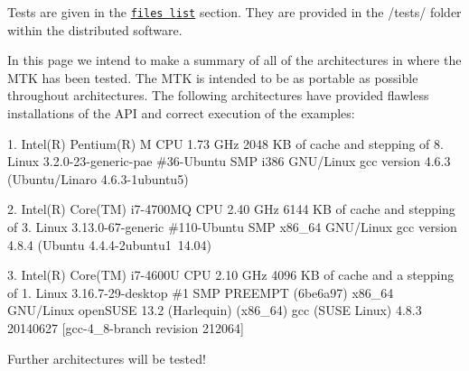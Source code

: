 Tests are given in the \href{files.html}{\tt files list} section. They are provided in the /tests/ folder within the distributed software.

In this page we intend to make a summary of all of the architectures in where the M\+T\+K has been tested. The M\+T\+K is intended to be as portable as possible throughout architectures. The following architectures have provided flawless installations of the A\+P\+I and correct execution of the examples\+:


\begin{DoxyPre}
1. Intel(R) Pentium(R) M CPU 1.73 GHz 2048 KB of cache and stepping of 8.
   Linux 3.2.0-23-generic-pae \#36-Ubuntu SMP i386 GNU/Linux
   gcc version 4.6.3 (Ubuntu/Linaro 4.6.3-1ubuntu5)\end{DoxyPre}



\begin{DoxyPre}2. Intel(R) Core(TM) i7-4700MQ CPU 2.40 GHz 6144 KB of cache and stepping of 3.
   Linux 3.13.0-67-generic \#110-Ubuntu SMP x86\_64 GNU/Linux
   gcc version 4.8.4 (Ubuntu 4.4.4-2ubuntu1~14.04)\end{DoxyPre}



\begin{DoxyPre}3. Intel(R) Core(TM) i7-4600U CPU 2.10 GHz 4096 KB of cache and a stepping of 1.
   Linux 3.16.7-29-desktop \#1 SMP PREEMPT (6be6a97) x86\_64 GNU/Linux
   openSUSE 13.2 (Harlequin) (x86\_64)
   gcc (SUSE Linux) 4.8.3 20140627 [gcc-4\_8-branch revision 212064]
\end{DoxyPre}


Further architectures will be tested! 